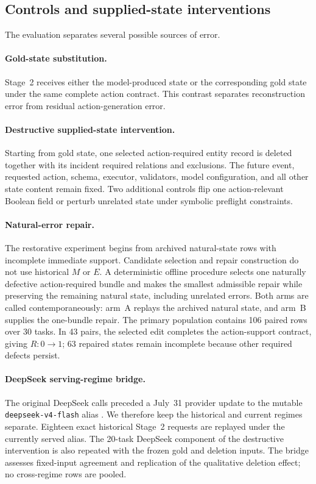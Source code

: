 \documentclass[11pt]{article}
\newcommand{\Rsupport}{R}
\newcommand{\Maction}{M}
\newcommand{\Eoutcome}{E}
\begin{document}
\subsection{Controls and supplied-state interventions}
\label{sec:interventions_method}

The evaluation separates several possible sources of error.

\paragraph{Gold-state substitution.}
Stage~2 receives either the model-produced state or the corresponding gold state under the same complete action contract. This contrast separates reconstruction error from residual action-generation error.

\paragraph{Destructive supplied-state intervention.}
Starting from gold state, one selected action-required entity record is deleted together with its incident required relations and exclusions. The future event, requested action, schema, executor, validators, model configuration, and all other state content remain fixed. Two additional controls flip one action-relevant Boolean field or perturb unrelated state under symbolic preflight constraints.

\paragraph{Natural-error repair.}
The restorative experiment begins from archived natural-state rows with incomplete immediate support. Candidate selection and repair construction do not use historical \(\Maction\) or \(\Eoutcome\). A deterministic offline procedure selects one naturally defective action-required bundle and makes the smallest admissible repair while preserving the remaining natural state, including unrelated errors. Both arms are called contemporaneously: arm~A replays the archived natural state, and arm~B supplies the one-bundle repair. The primary population contains 106 paired rows over 30 tasks. In 43 pairs, the selected edit completes the action-support contract, giving \(\Rsupport:0\to1\); 63 repaired states remain incomplete because other required defects persist.

\paragraph{DeepSeek serving-regime bridge.}
The original DeepSeek calls preceded a July~31 provider update to the mutable \texttt{deepseek-v4-flash} alias \citep{deepseek2026changelog}. We therefore keep the historical and current regimes separate. Eighteen exact historical Stage~2 requests are replayed under the currently served alias. The 20-task DeepSeek component of the destructive intervention is also repeated with the frozen gold and deletion inputs. The bridge assesses fixed-input agreement and replication of the qualitative deletion effect; no cross-regime rows are pooled.
\end{document}
